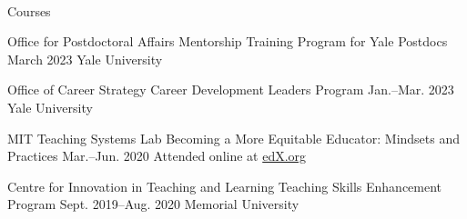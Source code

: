 \\



Courses

\begin{cventries}

  \cventry
    {Office for Postdoctoral Affairs} %
    {Mentorship Training Program for Yale Postdocs} %
    {March 2023} %
    {Yale University} %
    {
    }

  \cventry
    {Office of Career Strategy} %
    {Career Development Leaders Program} %
    {Jan.--Mar. 2023} %
    {Yale University} %
    {
    }

  \cventry
    {MIT Teaching Systems Lab} %
    {Becoming a More Equitable Educator: Mindsets and Practices} %
    {Mar.--Jun. 2020} %
    {Attended online at \href{www.edx.org}{edX.org}} %
    {
    }

  \cventry
    {Centre for Innovation in Teaching and Learning} %
    {Teaching Skills Enhancement Program} %
    {Sept. 2019--Aug. 2020} %
    {Memorial University} %
    {
    }

\end{cventries}

